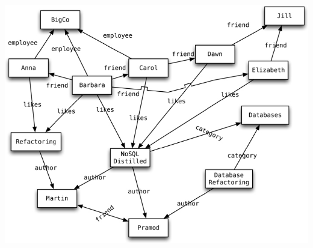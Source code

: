 \documentclass[14pt]{beamer}
\begin{document}
\begin{frame}[plain]
\includegraphics[width=\textwidth]{img/graph}
\end{frame}



\end{document}

